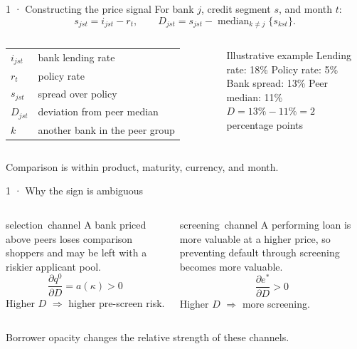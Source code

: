 \documentclass[aspectratio=169,11pt]{beamer}
\newcommand{\selection}{\textcolor{blue!60!black}{selection}}
\newcommand{\screening}{\textcolor{orange!80!black}{screening}}
\begin{document}
\begin{frame}{1 · Constructing the price signal}
  \small
  For bank \(j\), credit segment \(s\), and month \(t\):
  \[
    s_{jst}=i_{jst}-r_t,
    \qquad
    D_{jst}=s_{jst}-\operatorname{median}_{k\ne j}\{s_{kst}\}.
  \]
  \begin{columns}[T,onlytextwidth]
      \begin{tabular}{@{}ll@{}}
        \(i_{jst}\) & bank lending rate \\
        \(r_t\) & policy rate \\
        \(s_{jst}\) & spread over policy \\
        \(D_{jst}\) & deviation from peer median \\
        \(k\) & another bank in the peer group
      \end{tabular}
      \begin{block}{Illustrative example}
        Lending rate: 18\% \quad Policy rate: 5\%\\
        Bank spread: 13\% \quad Peer median: 11\%\\[0.3em]
        \centering\alert{\(D=13\%-11\%=2\) percentage points}
      \end{block}
  \end{columns}
  \vfill
  \footnotesize Comparison is within product, maturity, currency, and month.
\end{frame}

\begin{frame}{1 · Why the sign is ambiguous}
  \begin{columns}[T,onlytextwidth]
      \begin{block}{\selection\ channel}
        A bank priced above peers loses comparison shoppers and may be left
        with a riskier applicant pool.
        \[
          \frac{\partial q^0}{\partial D}=a(\kappa)>0
        \]
        Higher \(D\) \(\Rightarrow\) higher pre-screen risk.
      \end{block}
      \begin{block}{\screening\ channel}
        A performing loan is more valuable at a higher price, so preventing
        default through screening becomes more valuable.
        \[
          \frac{\partial e^*}{\partial D}>0
        \]
        Higher \(D\) \(\Rightarrow\) more screening.
      \end{block}
  \end{columns}
  \vfill
  \centering
  \alert{Borrower opacity changes the relative strength of these channels.}
\end{frame}
\end{document}
